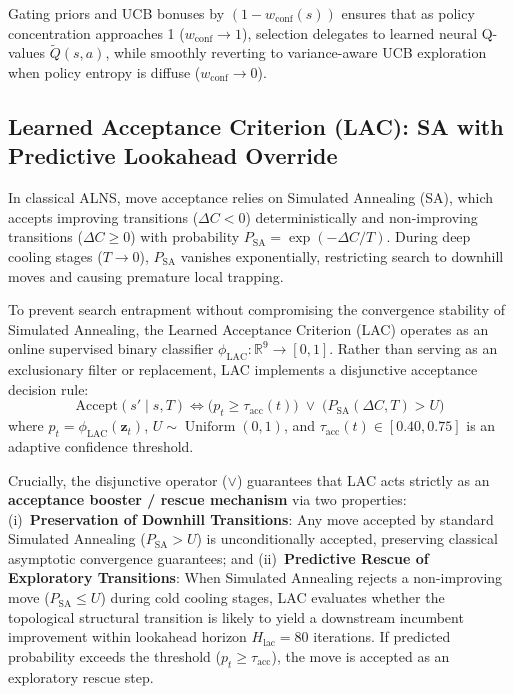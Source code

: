 \documentclass{ieeeaccess}
\begin{document}
Gating priors and UCB bonuses by $(1 - w_{\text{conf}}(s))$ ensures that as policy concentration approaches 1 ($w_{\text{conf}} \to 1$), selection delegates to learned neural Q-values $\tilde{Q}(s, a)$, while smoothly reverting to variance-aware UCB exploration when policy entropy is diffuse ($w_{\text{conf}} \to 0$).

\subsection{Learned Acceptance Criterion (LAC): SA with Predictive Lookahead Override}
\label{sec:lac}

In classical ALNS, move acceptance relies on Simulated Annealing (SA), which accepts improving transitions ($\Delta C < 0$) deterministically and non-improving transitions ($\Delta C \ge 0$) with probability $P_{\text{SA}} = \exp(-\Delta C / T)$. During deep cooling stages ($T \to 0$), $P_{\text{SA}}$ vanishes exponentially, restricting search to downhill moves and causing premature local trapping.

To prevent search entrapment without compromising the convergence stability of Simulated Annealing, the Learned Acceptance Criterion (LAC) operates as an online supervised binary classifier $\phi_{\text{LAC}}: \mathbb{R}^9 \to [0, 1]$. Rather than serving as an exclusionary filter or replacement, LAC implements a disjunctive acceptance decision rule:
\begin{equation}
  \text{Accept}(s' \mid s, T) \iff \Big( p_t \ge \tau_{\text{acc}}(t) \Big) \;\lor\; \Big( P_{\text{SA}}(\Delta C, T) > U \Big)
  \label{eq:lac_decision_rule}
\end{equation}
where $p_t = \phi_{\text{LAC}}(\mathbf{z}_t)$, $U \sim \operatorname{Uniform}(0, 1)$, and $\tau_{\text{acc}}(t) \in [0.40, 0.75]$ is an adaptive confidence threshold. 

Crucially, the disjunctive operator ($\lor$) guarantees that LAC acts strictly as an \textbf{acceptance booster / rescue mechanism} via two properties: (i)~\textbf{Preservation of Downhill Transitions}: Any move accepted by standard Simulated Annealing ($P_{\text{SA}} > U$) is unconditionally accepted, preserving classical asymptotic convergence guarantees; and (ii)~\textbf{Predictive Rescue of Exploratory Transitions}: When Simulated Annealing rejects a non-improving move ($P_{\text{SA}} \le U$) during cold cooling stages, LAC evaluates whether the topological structural transition is likely to yield a downstream incumbent improvement within lookahead horizon $H_{\text{lac}} = 80$ iterations. If predicted probability exceeds the threshold ($p_t \ge \tau_{\text{acc}}$), the move is accepted as an exploratory rescue step.
\end{document}
